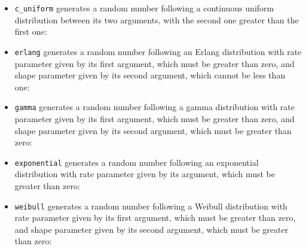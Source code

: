 	\begin{itemize}

\item {\tt c\_uniform} generates a random number following a continuous uniform distribution between its two
arguments, with the second one greater than the first one:

\item {\tt erlang} generates a random number following an Erlang distribution with rate parameter given by
its first argument, which must be greater than zero, and shape parameter given by its second argument, which
cannot be less than one:

\item {\tt gamma} generates a random number following a gamma distribution with rate parameter given by its
first argument, which must be greater than zero, and shape parameter given by its second argument, which
must be greater than zero:

\item {\tt exponential} generates a random number following an exponential distribution with rate parameter
given by its argument, which must be greater than zero:

\item {\tt weibull} generates a random number following a Weibull distribution with rate parameter given by
its first argument, which must be greater than zero, and shape parameter given by its second argument, which
must be greater than zero:


\end{itemize}
